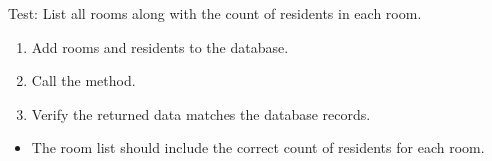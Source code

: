 \documentclass[letterpaper,10pt,english]{sphinxmanual}
\begin{document}
\begin{fulllineitems}
\label{\detokenize{test:test.test_room.test_list_rooms_with_resident_count}}
\pysigstartsignatures
\pysiglinewithargsret
{}
{}
{}
\pysigstopsignatures
\sphinxAtStartPar
Test: List all rooms along with the count of residents in each room.
\begin{description}
\begin{enumerate}
%
\item {} 
\sphinxAtStartPar
Add rooms and residents to the database.

\item {} 
\sphinxAtStartPar
Call the  method.

\item {} 
\sphinxAtStartPar
Verify the returned data matches the database records.

\end{enumerate}

\begin{itemize}
\item {} 
\sphinxAtStartPar
The room list should include the correct count of residents for each room.

\end{itemize}

\end{description}

\end{fulllineitems}

\end{document}
